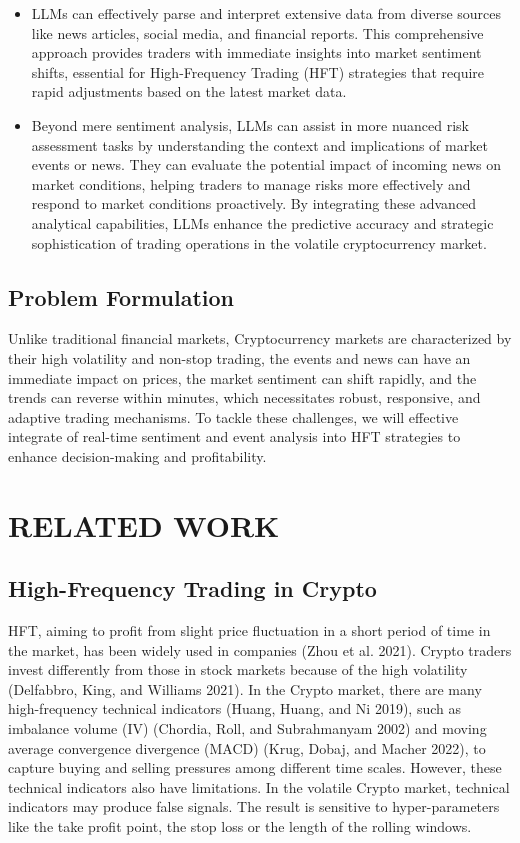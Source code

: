 \documentclass[conference]{IEEEtran}
\begin{document}
\begin{itemize}
\item LLMs can effectively parse and interpret extensive data from diverse sources like news articles, social media, and financial reports. This comprehensive approach provides traders with immediate insights into market sentiment shifts, essential for High-Frequency Trading (HFT) strategies that require rapid adjustments based on the latest market data.
\item Beyond mere sentiment analysis, LLMs can assist in more nuanced risk assessment tasks by understanding the context and implications of market events or news. They can evaluate the potential impact of incoming news on market conditions, helping traders to manage risks more effectively and respond to market conditions proactively. By integrating these advanced analytical capabilities, LLMs enhance the predictive accuracy and strategic sophistication of trading operations in the volatile cryptocurrency market.
\end{itemize}

\subsection{Problem Formulation}

Unlike traditional financial markets, Cryptocurrency markets are characterized by their high volatility and non-stop trading, the events and news can have an immediate impact on prices, the market sentiment can shift rapidly, and the trends can reverse within minutes, which necessitates robust, responsive, and adaptive trading mechanisms. To tackle these challenges, we will effective integrate of real-time sentiment and event analysis into HFT strategies to enhance decision-making and profitability.

\section{RELATED WORK}

\subsection{High-Frequency Trading in Crypto}

HFT, aiming to profit from slight price fluctuation in a short period of time in the market, has been widely used in companies (Zhou et al. 2021). Crypto traders invest differently from those in stock markets because of the high volatility (Delfabbro, King, and Williams 2021). In the Crypto market, there are many high-frequency technical indicators (Huang, Huang, and Ni 2019), such as imbalance volume (IV) (Chordia, Roll, and Subrahmanyam 2002) and moving average convergence divergence (MACD) (Krug, Dobaj, and Macher 2022), to capture buying and selling pressures among different time scales. However, these technical indicators also have limitations. In the volatile Crypto market, technical indicators may produce false signals. The result is sensitive to hyper-parameters like the take profit point, the stop loss or the length of the rolling windows.
\end{document}
